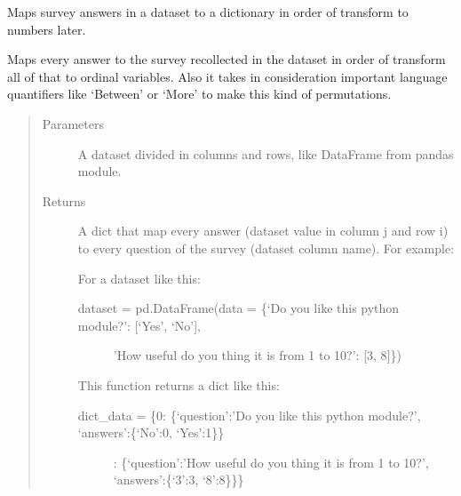 \documentclass[letterpaper,10pt,english]{sphinxmanual}
\begin{document}
\begin{fulllineitems}
\label{\detokenize{index:SurveyHumpbackWhale.map_answers_to_categories}}
Maps survey answers in a dataset to a dictionary in order of transform to numbers later.

Maps every answer to the survey recollected in the dataset in order of transform all of
that to ordinal variables. Also it takes in consideration important language quantifiers
like ‘Between’ or ‘More’ to make this kind of permutations.
\begin{quote}\begin{description}
\item[{Parameters}] \leavevmode
{} \textendash{} A dataset divided in columns and rows, like DataFrame from pandas module.

\item[{Returns}] \leavevmode

A dict that map every answer (dataset value in column j and row i) to every question
of the survey (dataset column name). For example:

For a dataset like this:
\begin{description}
\item[{dataset = pd.DataFrame(data = \{‘Do you like this python module?’: {[}‘Yes’, ‘No’{]},}] \leavevmode
’How useful do you thing it is from 1 to 10?’: {[}3, 8{]}\})

\end{description}

This function returns a dict like this:
\begin{description}
\item[{dict\_data = \{0: \{‘question’:’Do you like this python module?’, ‘answers’:\{‘No’:0, ‘Yes’:1\}\}}] : \{‘question’:’How useful do you thing it is from 1 to 10?’, ‘answers’:\{‘3’:3, ‘8’:8\}\}\}

\end{description}


\end{description}\end{quote}

\end{fulllineitems}

\end{document}
